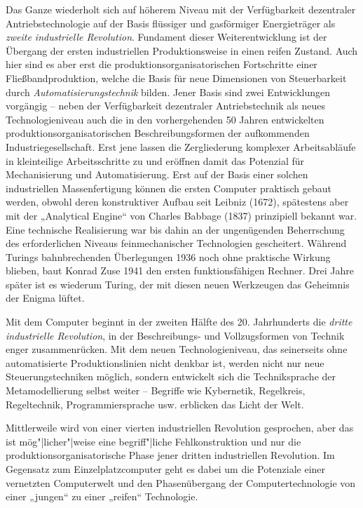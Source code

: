 \documentclass[12pt,a4paper]{article}
\begin{document}
Das Ganze wiederholt sich auf höherem Niveau mit der Verfügbarkeit dezentraler
Antriebstechnologie auf der Basis flüssiger und gasförmiger Energieträger als
\emph{zweite industrielle Revolution}. Fundament dieser Weiterentwicklung ist
der Übergang der ersten industriellen Produktionsweise in einen reifen
Zustand.  Auch hier sind es aber erst die produktionsorganisatorischen
Fortschritte einer Fließbandproduktion, welche die Basis für neue Dimensionen
von Steuerbarkeit durch \emph{Automatisierungstechnik} bilden.  Jener Basis
sind zwei Entwicklungen vorgängig -- neben der Verfügbarkeit dezentraler
Antriebstechnik als neues Technologieniveau auch die in den vorhergehenden 50
Jahren entwickelten produktionsorganisatorischen Beschreibungsformen der
aufkommenden Industriegesellschaft.  Erst jene lassen die Zergliederung
komplexer Arbeitsabläufe in kleinteilige Arbeitsschritte zu und eröffnen damit
das Potenzial für Mechanisierung und Automatisierung. Erst auf der Basis einer
solchen industriellen Massenfertigung können die ersten Computer praktisch
gebaut werden, obwohl deren konstruktiver Aufbau seit Leibniz (1672),
spätestens aber mit der „Analytical Engine“ von Charles Babbage (1837)
prinzipiell bekannt war. Eine technische Realisierung war bis dahin an der
ungenügenden Beherrschung des erforderlichen Niveaus feinmechanischer
Technologien gescheitert.  Während Turings bahnbrechenden Überlegungen 1936
noch ohne praktische Wirkung blieben, baut Konrad Zuse 1941 den ersten
funktionsfähigen Rechner. Drei Jahre später ist es wiederum Turing, der mit
diesen neuen Werkzeugen das Geheimnis der Enigma lüftet.

Mit dem Computer beginnt in der zweiten Hälfte des 20. Jahrhunderts die
\emph{dritte industrielle Revolution}, in der Beschreibungs- und
Vollzugsformen von Technik enger zusammenrücken. Mit dem neuen
Technologieniveau, das seinerseits ohne automatisierte Produktionslinien nicht
denkbar ist, werden nicht nur neue Steuerungstechniken möglich, sondern
entwickelt sich die Techniksprache der Metamodellierung selbst weiter --
Begriffe wie Kybernetik, Regelkreis, Regeltechnik, Programmiersprache usw.
erblicken das Licht  der Welt.

Mittlerweile wird von einer vierten industriellen Revolution gesprochen, aber
das ist mög"|licher"|weise eine begriff"|liche Fehlkonstruktion und nur die
produktionsorganisatorische Phase jener dritten industriellen Revolution. Im
Gegensatz zum Einzelplatzcomputer geht es dabei um die Potenziale einer
vernetzten Computerwelt und den Phasenübergang der Computertechnologie von
einer „jungen“ zu einer „reifen“ Technologie.
\end{document}
